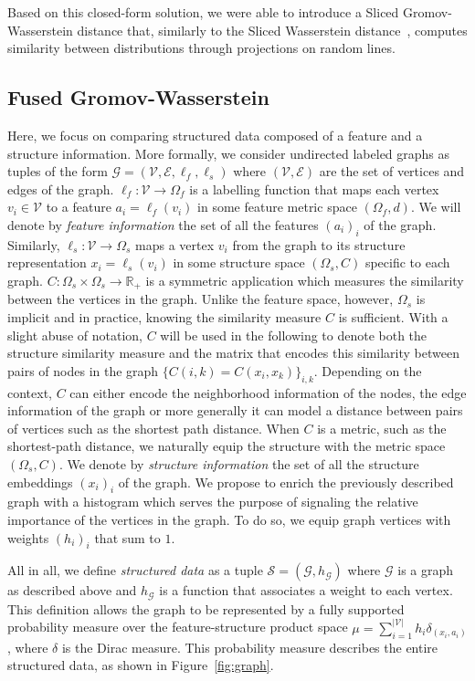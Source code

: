 Based on this closed-form solution, we were able to introduce a Sliced
Gromov-Wasserstein distance that, similarly to the Sliced Wasserstein
distance~\cite{rabin2011wasserstein}, computes similarity between distributions
through projections on random lines.

\subsection{Fused Gromov-Wasserstein}

Here, we focus on comparing structured data composed of a feature
and a structure information.
More formally, we consider undirected labeled graphs as tuples of the form $\mathcal{G}=(\mathcal{V},\mathcal{E},\ell_f,\ell_s)$ where
$(\mathcal{V},\mathcal{E})$ are the set of vertices and edges of the graph.
$\ell_f: \mathcal{V} \rightarrow \Omega_f$ is a labelling function that
maps each vertex $v_{i} \in \mathcal{V}$ to a feature
$a_{i} = \ell_f(v_{i})$ in some feature metric space
$(\Omega_f,d)$.
We will denote by \emph{feature information} the set of all the features
$(a_{i})_{i}$ of the graph.
Similarly, $\ell_s: \mathcal{V} \rightarrow \Omega_s$ maps a vertex $v_i$ from
the graph to its structure representation
$x_{i} = \ell_s(v_{i})$ in some structure space
$(\Omega_s,C)$ specific to each graph.
$C : \Omega_s \times \Omega_s \rightarrow \mathbb{R_{+}}$ is a symmetric
application which measures the similarity between the vertices in the
graph.
Unlike the feature space, however, $\Omega_s$ is implicit and in practice,
knowing the similarity measure $C$ is sufficient. With a slight abuse of
notation, $C$ will be used in the following to denote both the structure
similarity measure and the matrix that encodes this similarity between pairs of
nodes in the graph $\{C(i,k) = C(x_i, x_k)\}_{i,k}$.
Depending on the context, $C$ can either encode the neighborhood information of
the nodes, the edge information of the graph or more generally it can model a
distance between pairs of vertices such as the shortest path distance.
When $C$ is a metric, such as the shortest-path
distance, we naturally equip the structure with the metric space $(\Omega_s,C)$.
We denote by \emph{structure information} the set of all the structure
embeddings $(x_{i})_i$ of the graph.
We propose to enrich the previously described graph with a histogram which
serves the purpose of signaling the relative importance of the vertices in the
graph.
To do so, we equip graph vertices with weights $(h_{i})_{i}$ that sum to $1$.

All in all, we define \emph{structured data} as a
tuple $\mathcal{S}=(\mathcal{G},h_{\mathcal{G}})$ where $\mathcal{G}$ is a
graph as described above and $h_{\mathcal{G}}$ is a function that
associates a weight to each vertex. This definition allows the graph to be
represented by a fully supported probability measure over the
feature-structure product space
$\mu= \sum_{i=1}^{|\mathcal{V}|} h_{i} \delta_{(x_{i},a_{i})}$, where
$\delta$ is the Dirac measure.
This probability measure
describes the entire structured data, as shown in Figure~\ref{fig:graph}.

